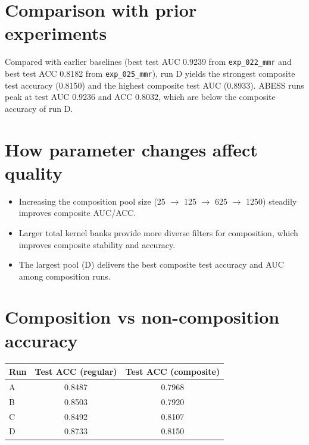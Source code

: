 \documentclass{article}
\begin{document}

\section*{Comparison with prior experiments}
Compared with earlier baselines (best test AUC 0.9239 from \texttt{exp\_022\_mmr} and best test ACC 0.8182 from \texttt{exp\_025\_mmr}), run D yields the strongest composite test accuracy (0.8150) and the highest composite test AUC (0.8933). ABESS runs peak at test AUC 0.9236 and ACC 0.8032, which are below the composite accuracy of run D.

\section*{How parameter changes affect quality}
\begin{itemize}
    \item Increasing the composition pool size (25 $\rightarrow$ 125 $\rightarrow$ 625 $\rightarrow$ 1250) steadily improves composite AUC/ACC.
    \item Larger total kernel banks provide more diverse filters for composition, which improves composite stability and accuracy.
    \item The largest pool (D) delivers the best composite test accuracy and AUC among composition runs.
\end{itemize}

\section*{Composition vs non-composition accuracy}
\begin{center}
\begin{tabular}{lcc}
\toprule
Run & Test ACC (regular) & Test ACC (composite) \\
\midrule
A & 0.8487 & 0.7968 \\
B & 0.8503 & 0.7920 \\
C & 0.8492 & 0.8107 \\
D & 0.8733 & 0.8150 \\
\bottomrule
\end{tabular}
\end{center}
\end{document}
